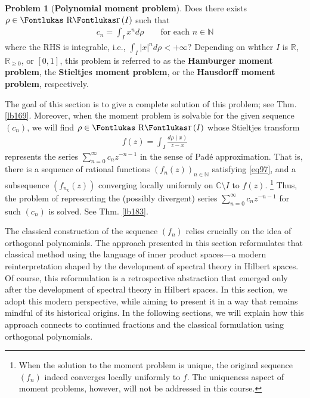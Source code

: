 \documentclass[12pt,b5paper,notitlepage]{article}
\theoremstyle{definition}
\newtheorem{problem}[df]{Problem}
\theoremstyle{plain}
\DeclareMathOperator{\Rr}{\text{\Fontlukas R}\text{\kern -0pt {\Fontlukas\large r}}\,}
\newcommand{\Cbb}{\mathbb C}
\newcommand{\Nbb}{\mathbb N}
\newcommand{\Rbb}{\mathbb R}
\numberwithin{equation}{section}
\begin{document}
\begin{problem}[\textbf{Polynomial moment problem}] \label{lb162}
Does there exists $\rho\in\Rr(I)$ such that
\begin{align}\label{eq79}
c_n=\int_I x^nd\rho\qquad\text{for each $n\in\Nbb$}
\end{align}
where the RHS is integrable, i.e., $\int_I |x|^nd\rho<+\infty$? Depending on whther $I$ is $\Rbb$, $\Rbb_{\geq0}$, or $[0,1]$, this problem is referred to as the \textbf{Hamburger moment problem},  the \textbf{Stieltjes moment problem},  or the \textbf{Hausdorff moment problem},  respectively.
\end{problem}

The goal of this section is to give a complete solution of this problem; see Thm. \ref{lb169}. Moreover, when the moment problem is solvable for the given sequence $(c_n)$, we will find $\rho\in\Rr(I)$ whose Stieltjes transform
\begin{align*}
f(z)=\int_I\frac{d\rho(x)}{z-x}
\end{align*}
represents the series $\sum_{n=0}^\infty c_nz^{-n-1}$ in the sense of Pad\'e approximation. That is, there is a sequence of rational functions $(f_n(z))_{n\in\Nbb}$ satisfying \eqref{eq97}, and a subsequence $(f_{n_k}(z))$ converging locally uniformly on $\Cbb\setminus I$ to $f(z)$. \footnote{When the solution to the moment problem is unique, the original sequence $(f_n)$ indeed converges locally uniformly to $f$. The uniqueness aspect of moment problems, however, will not be addressed in this course.} Thus, the problem of representing the (possibly divergent) series $\sum_{n=0}^\infty c_nz^{-n-1}$ for such $(c_n)$ is solved. See Thm. \ref{lb183}.



The classical construction of the sequence $(f_n)$ relies crucially on the idea of orthogonal polynomials. The approach presented in this section reformulates that classical method using the language of inner product spaces---a modern reinterpretation shaped by the development of spectral theory in Hilbert spaces. Of course, this reformulation is a retrospective abstraction that emerged only after the development of spectral theory in Hilbert spaces. In this section, we adopt this modern perspective, while aiming to present it in a way that remains mindful of its historical origins. In the following sections, we will explain how this approach connects to continued fractions and the classical formulation using orthogonal polynomials.
\end{document}
